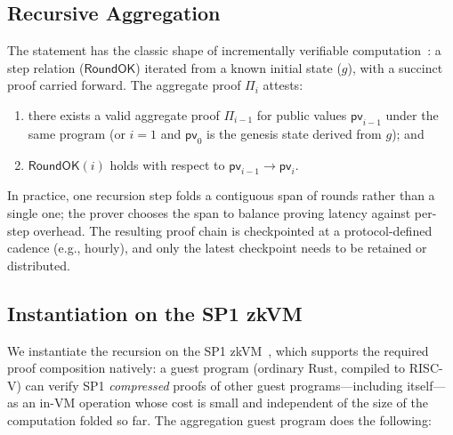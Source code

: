 \documentclass[11pt]{article}
\begin{document}
\subsection{Recursive Aggregation}

The statement has the classic shape of incrementally verifiable computation~\cite{valiant2008ivc}: a step relation ($\mathsf{RoundOK}$) iterated from a known initial state ($g$), with a succinct proof carried forward. The aggregate proof $\Pi_i$ attests:
\begin{enumerate}[nosep]
  \item there exists a valid aggregate proof $\Pi_{i-1}$ for public values $\mathsf{pv}_{i-1}$ under the same program (or $i = 1$ and $\mathsf{pv}_0$ is the genesis state derived from $g$); and
  \item $\mathsf{RoundOK}(i)$ holds with respect to $\mathsf{pv}_{i-1} \to \mathsf{pv}_i$.
\end{enumerate}
In practice, one recursion step folds a contiguous span of rounds rather than a single one; the prover chooses the span to balance proving latency against per-step overhead. The resulting proof chain is checkpointed at a protocol-defined cadence (e.g., hourly), and only the latest checkpoint needs to be retained or distributed.

\subsection{Instantiation on the SP1 zkVM}
\label{sec:sp1-instantiation}

We instantiate the recursion on the SP1 zkVM~\cite{sp1}, which supports the required proof composition natively: a guest program (ordinary Rust, compiled to RISC-V) can verify SP1 \emph{compressed} proofs of other guest programs---including itself---as an in-VM operation whose cost is small and independent of the size of the computation folded so far. The aggregation guest program does the following:
\end{document}
